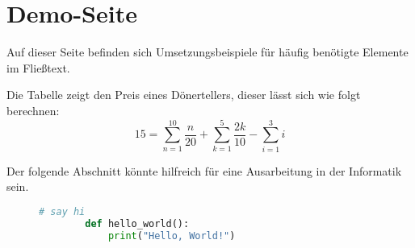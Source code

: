 \section{Demo-Seite}
Auf dieser Seite befinden sich Umsetzungsbeispiele für häufig benötigte Elemente im Fließtext.\\


Die Tabelle zeigt den Preis eines Dönertellers, dieser lässt sich wie folgt berechnen:
\begin{equation}%
    15 = \sum_{n=1}^{10} \frac{n}{20} + \sum_{k=1}^{5} \frac{2k}{10} - \sum_{i=1}^{3} i
\end{equation}

\newpage
Der folgende Abschnitt könnte hilfreich für eine Ausarbeitung in der Informatik sein.
\begin{figure}[H] %
    \begin{lstlisting}[language=python]
        # say hi
        def hello_world():
            print("Hello, World!")
    \end{lstlisting}
    \label{fig:meincode}%
\end{figure}

